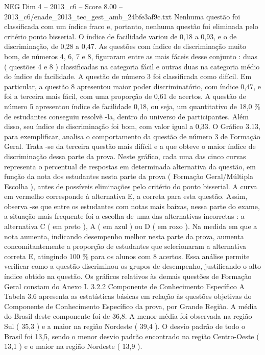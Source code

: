 \begin{textsample}{NEG Dim 4 – 2013\_c6 – Score 8.00 – 2013\_c6/enade\_2013\_tec\_gest\_amb\_24bfe3af9c.txt}
Nenhuma questão foi classificada com um índice fraco e, portanto, nenhuma questão foi eliminada pelo critério ponto bisserial.
O índice de facilidade variou de 0,18 a 0,93, e o de discriminação, de 0,28 a 0,47.
As questões com índice de discriminação muito bom, de números 4, 6, 7 e 8, figuraram entre as mais fáceis desse conjunto : duas ( questões 4 e 8 ) classificadas na categoria fácil e outras duas na categoria médio do índice de facilidade.
A questão de número 3 foi classificada como difícil.
Em particular, a questão 8 apresentou maior poder discriminatório, com índice 0,47, e foi a terceira mais fácil, com uma proporção de 0,61 de acertos.
A questão de número 5 apresentou índice de facilidade 0,18, ou seja, um quantitativo de 18,0 \% de estudantes conseguiu resolvê -la, dentro do universo de participantes.
Além disso, seu índice de discriminação foi bom, com valor igual a 0,33.
O Gráfico 3.13, para exemplificar, analisa o comportamento da questão de número 3 de Formação Geral.
Trata -se da terceira questão mais difícil e a que obteve o maior índice de discriminação dessa parte da prova.
Neste gráfico, cada uma das cinco curvas representa o percentual de respostas em determinada alternativa da questão, em função da nota dos estudantes nesta parte da prova ( Formação Geral/Múltipla Escolha ), antes de possíveis eliminações pelo critério do ponto bisserial.
A curva em vermelho corresponde à alternativa E, a correta para esta questão.
Assim, observa -se que entre os estudantes com notas mais baixas, nessa parte do exame, a situação mais frequente foi a escolha de uma das alternativas incorretas : a alternativa C ( em preto ), A ( em azul ) ou D ( em roxo ).
Na medida em que a nota aumenta, indicando desempenho melhor nesta parte da prova, aumenta concomitantemente a proporção de estudantes que selecionaram a alternativa correta E, atingindo 100 \% para os alunos com 8 acertos.
Essa análise permite verificar como a questão discriminou os grupos de desempenho, justificando o alto índice obtido na questão.
Os gráficos relativos às demais questões de Formação Geral constam do Anexo I. 3.2.2 Componente de Conhecimento Específico A Tabela 3.6 apresenta as estatísticas básicas em relação às questões objetivas do Componente de Conhecimento Específico da prova, por Grande Região.
A média do Brasil deste componente foi de 36,8.
A menor média foi observada na região Sul ( 35,3 ) e a maior na região Nordeste ( 39,4 ).
O desvio padrão de todo o Brasil foi 13,5, sendo o menor desvio padrão encontrado na região Centro-Oeste ( 13,1 ) e o maior na região Nordeste ( 13,9 ).

\end{textsample}
